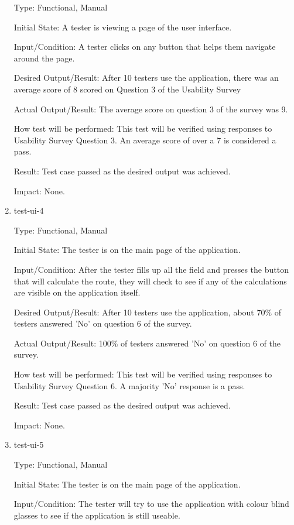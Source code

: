 \documentclass[12pt, titlepage]{article}
\begin{document}
\begin{enumerate}
Type: Functional, Manual

Initial State: A tester is viewing a page of the user interface.

Input/Condition: A tester clicks on any button that helps them navigate around the page. 

Desired Output/Result: After 10 testers use the application,  there was an average score of 8 scored on Question 3 of the Usability Survey

Actual Output/Result: The average score on question 3 of the survey was 9.

How test will be performed: This test will be verified using responses to Usability Survey Question 3. An average score of over a 7 is considered a pass.

Result: Test case passed as the desired output was achieved.

Impact: None.

\item{test-ui-4\\}

Type: Functional, Manual

Initial State: The tester is on the main page of the application.

Input/Condition: After the tester fills up all the field and presses the button that will calculate the route, they will check to see if any of the calculations are visible on the application itself.

Desired Output/Result: After 10 testers use the application, about 70\% of testers answered 'No' on question 6 of the survey.

Actual Output/Result: 100\% of testers answered 'No' on question 6 of the survey.

How test will be performed: This test will be verified using responses to Usability Survey Question 6. A majority 'No' response is a pass.

Result: Test case passed as the desired output was achieved.

Impact: None.

\item{test-ui-5\\}

Type: Functional, Manual

Initial State: The tester is on the main page of the application.

Input/Condition: The tester will try to use the application with colour blind glasses to see if the application is still useable.


\end{enumerate}
\end{document}
